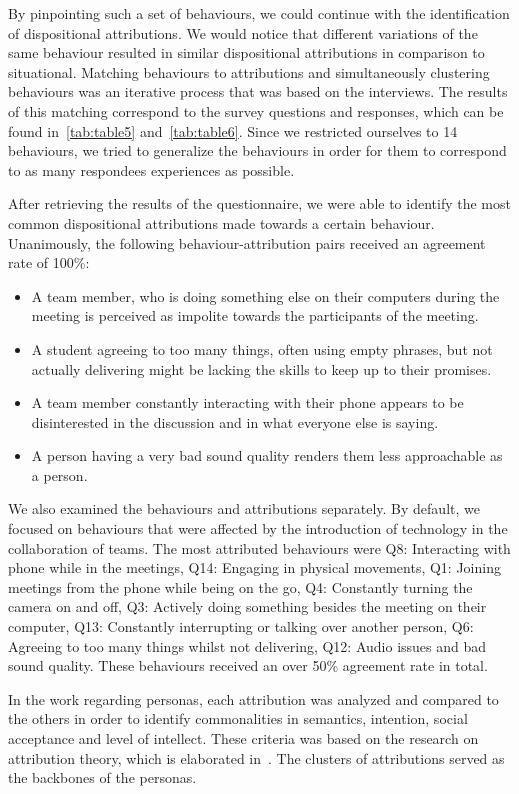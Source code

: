 By pinpointing such a set of behaviours, we could continue with the identification of dispositional attributions.  We would notice that different variations of the same behaviour resulted in similar dispositional attributions in comparison to situational. Matching behaviours to attributions and simultaneously clustering behaviours was an iterative process that was based on the interviews. The results of this matching correspond to the survey questions and responses, which can be found in~\autoref{tab:table5} and~\autoref{tab:table6}.  Since we restricted ourselves to 14 behaviours,  we tried to generalize the behaviours in order for them to correspond to as many respondees experiences as possible.  

After retrieving the results of the questionnaire, we were able to identify the most common dispositional attributions made towards a certain behaviour.  Unanimously, the following behaviour-attribution pairs received an agreement rate of 100\%:
\begin{itemize}
	\item A team member, who is doing something else on their computers during the meeting is perceived as impolite towards the participants of the meeting.
	\item A student agreeing to too many things, often using empty phrases, but not actually delivering might be lacking the skills to keep up to their promises.
	\item A team member constantly interacting with their phone appears to be disinterested in the discussion and in what everyone else is saying.
	\item A person having a very bad sound quality renders them less approachable as a person.
\end{itemize}

We also examined the behaviours and attributions separately.  By default, we focused on behaviours that were affected by the introduction of technology in the collaboration of teams. The most attributed behaviours were Q8: Interacting with phone while in the meetings, Q14: Engaging in physical movements, Q1: Joining meetings from the phone while being on the go, Q4: Constantly turning the camera on and off,  Q3: Actively doing something besides the meeting on their computer,  Q13: Constantly interrupting or talking over another person, Q6: Agreeing to too many things whilst not delivering, Q12: Audio issues and bad sound quality. These behaviours received an over 50\% agreement rate in total.

In the work regarding personas,  each attribution was analyzed and compared to the others in order to identify commonalities in semantics, intention, social acceptance and level of intellect.  These criteria was based on the research on attribution theory, which is elaborated in~.  The clusters of attributions served as the backbones of the personas. 

